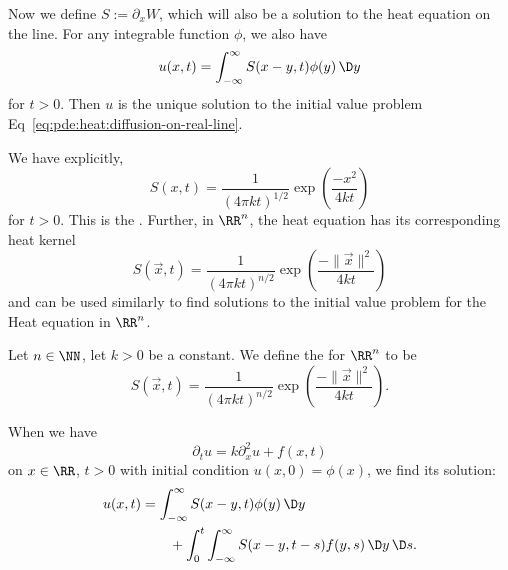 \begin{node}
\begin{node}[Solution]
\begin{node}[Step 4]\label{pde:heat-000D}%
Now we define $S:=\partial_{x}W$, which will also be a solution to the
heat equation on the line. For any integrable function $\phi$, we also
have
\begin{equation}
u(x,t)=\int^{\infty}_{-\infty}S(x-y,t)\phi(y)\,\D y
\end{equation}
for $t>0$. Then $u$ is the unique solution to the initial value problem 
Eq~\eqref{eq:pde:heat:diffusion-on-real-line}.

We have explicitly,
\begin{equation}
S(x,t) = \frac{1}{(4\pi kt)^{1/2}}\exp\left(\frac{-x^{2}}{4kt}\right)
\end{equation}
for $t>0$. This is the . Further, in $\RR^{n}$, the
heat equation has its corresponding heat kernel
\begin{equation}
S(\vec{x},t) = \frac{1}{(4\pi kt)^{n/2}}\exp\left(\frac{-\|\vec{x}\|^{2}}{4kt}\right)
\end{equation}
and can be used similarly to find solutions to the initial value problem
for the Heat equation in $\RR^{n}$.
\end{node} %

\begin{definition}\label{pde:heat-000E}%
Let $n\in\NN$, let $k>0$ be a constant.
We define the  for $\RR^{n}$ to be
\begin{equation*}
S(\vec{x},t) = \frac{1}{(4\pi kt)^{n/2}}\exp\left(\frac{-\|\vec{x}\|^{2}}{4kt}\right).
\end{equation*}
\end{definition}
\end{node} %

\begin{node}\label{pde:heat-000F}%
When we have
\begin{equation*}
\partial_{t}u = k\partial_{x}^{2}u+f(x,t)
\end{equation*}
on $x\in\RR$, $t>0$ with initial condition $u(x,0)=\phi(x)$, we find its
solution: 
\begin{equation}
\begin{split}
u(x,t) &=\int^{\infty}_{-\infty}S(x-y,t)\phi(y)\,\D y\\
&\qquad+\int^{t}_{0}\int^{\infty}_{-\infty}S(x-y,t-s)f(y,s)\,\D y\,\D s.
\end{split}
\end{equation}


\end{node}
\end{node}
